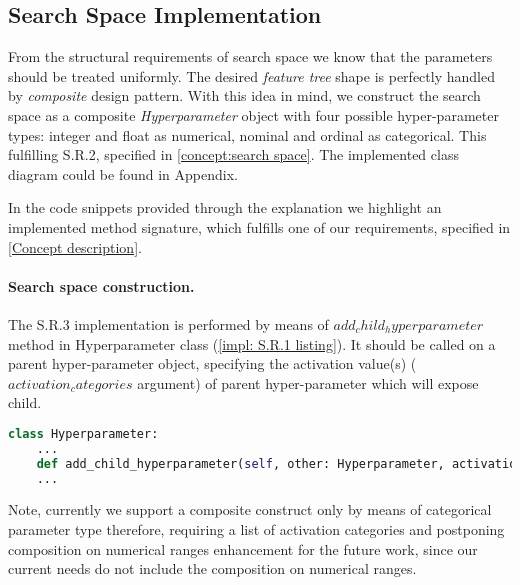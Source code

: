 \subsection{Search Space Implementation}
From the structural requirements of search space we know that the parameters should be treated uniformly. The desired \emph{feature tree} shape is perfectly handled by \emph{composite} design pattern. With this idea in mind, we construct the search space as a composite \emph{Hyperparameter} object with four possible hyper-parameter types: integer and float as numerical, nominal and ordinal as categorical. This fulfilling S.R.2, specified in \cref{concept:search space}. The implemented class diagram could be found in Appendix.

In the code snippets provided through the explanation we highlight an implemented method  signature, which fulfills one of our requirements, specified in \cref{Concept description}.

\paragraph{Search space construction.} The S.R.3 implementation is performed by means of $add_child_hyperparameter$ method in Hyperparameter class (\cref{impl: S.R.1 listing}). It should be called on a parent hyper-parameter object, specifying the activation value(s) ($activation_categories$ argument) of parent hyper-parameter which will expose child. 

\begin{lstlisting}[language=Python, caption=S.R.1 implementation., label=impl: S.R.1 listing]
class Hyperparameter:
	...
	def add_child_hyperparameter(self, other: Hyperparameter, activation_categories: Iterable[_CATEGORY]) -> Hyperparameter: pass
	...
\end{lstlisting}

Note, currently we support a composite construct only by means of categorical parameter type therefore, requiring a list of activation categories and postponing composition on numerical ranges enhancement for the future work, since our current needs do not include the composition on numerical ranges.

